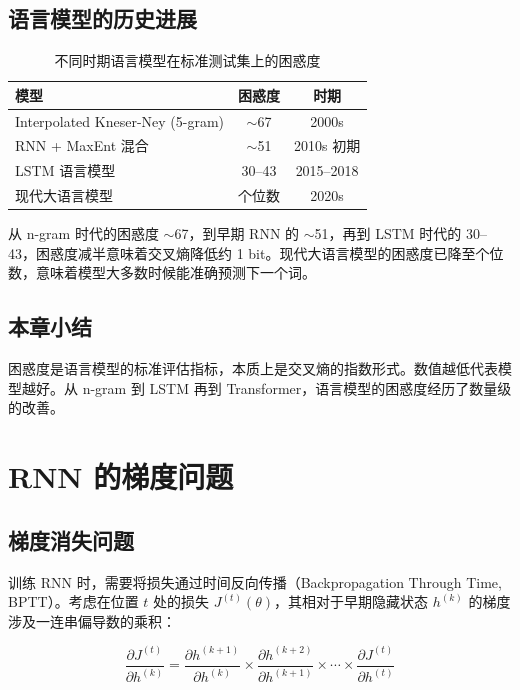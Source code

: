 \documentclass[a4paper]{article}
\begin{document}
\subsection{语言模型的历史进展}





\begin{table}[H]
\centering
\begin{tabular}{lcc}
\toprule
\textbf{模型} & \textbf{困惑度} & \textbf{时期} \\
\midrule
Interpolated Kneser-Ney (5-gram) & $\sim$67 & 2000s \\
RNN + MaxEnt 混合 & $\sim$51 & 2010s 初期 \\
LSTM 语言模型 & 30--43 & 2015--2018 \\
现代大语言模型 & 个位数 & 2020s \\
\bottomrule
\end{tabular}
\caption{不同时期语言模型在标准测试集上的困惑度}
\end{table}

从 n-gram 时代的困惑度 $\sim$67，到早期 RNN 的 $\sim$51，再到 LSTM 时代的 30--43，困惑度减半意味着交叉熵降低约 1 bit。现代大语言模型的困惑度已降至个位数，意味着模型大多数时候能准确预测下一个词。

\subsection{本章小结}

困惑度是语言模型的标准评估指标，本质上是交叉熵的指数形式。数值越低代表模型越好。从 n-gram 到 LSTM 再到 Transformer，语言模型的困惑度经历了数量级的改善。


\section{RNN 的梯度问题}

\subsection{梯度消失问题}

训练 RNN 时，需要将损失通过时间反向传播（Backpropagation Through Time, BPTT）。考虑在位置 $t$ 处的损失 $J^{(t)}(\theta)$，其相对于早期隐藏状态 $h^{(k)}$ 的梯度涉及一连串偏导数的乘积：

$$\frac{\partial J^{(t)}}{\partial h^{(k)}} = \frac{\partial h^{(k+1)}}{\partial h^{(k)}} \times \frac{\partial h^{(k+2)}}{\partial h^{(k+1)}} \times \cdots \times \frac{\partial J^{(t)}}{\partial h^{(t)}}$$
\end{document}
